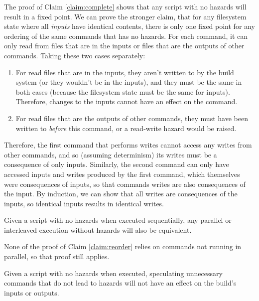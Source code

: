 \proof The proof of Claim \ref{claim:complete} shows that any script with no hazards will result in a fixed point. We can prove the stronger claim, that for any filesystem state where all \emph{inputs} have identical contents, there is only one fixed point for any ordering of the same commands that has no hazards. For each command, it can only read from files that are in the inputs or files that are the outputs of other commands. Taking these two cases separately:

\begin{enumerate}
\item For read files that are in the inputs, they aren't written to by the build system (or they wouldn't be in the inputs), and they must be the same in both cases (because the filesystem state must be the same for inputs). Therefore, changes to the inputs cannot have an effect on the command.
\item For read files that are the outputs of other commands, they must have been written to \emph{before} this command, or a read-write hazard would be raised.
\end{enumerate}

Therefore, the first command that performs writes cannot access any writes from other commands, and so (assuming determinism) its writes must be a consequence of only inputs. Similarly, the second command can only have accessed inputs and writes produced by the first command, which themselves were consequences of inputs, so that commands writes are also consequences of the input. By induction, we can show that all writes are consequences of the inputs, so identical inputs results in identical writes.

\begin{claim}
\label{claim:parallel}

Given a script with no hazards when executed sequentially, any parallel or interleaved execution without hazards will also be equivalent.
\end{claim}

\proof None of the proof of Claim \ref{claim:reorder} relies on commands not running in parallel, so that proof still applies.

\begin{claim}
\label{claim:additional}

 Given a script with no hazards when executed, speculating unnecessary commands that do not lead to hazards will not have an effect on the build's inputs or outputs.
\end{claim}

